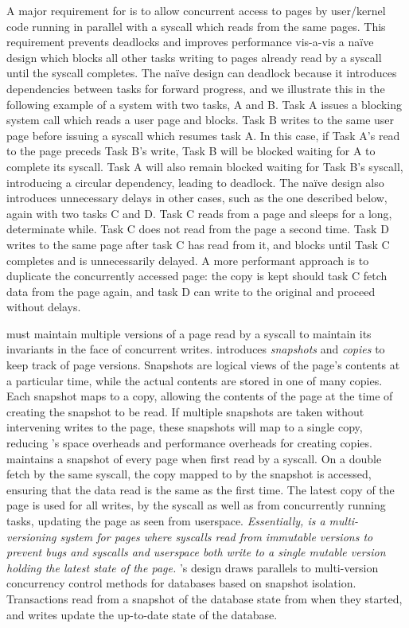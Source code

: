 \documentclass[letterpaper,twocolumn,10pt, anonymous]{article}
\begin{document}
A major requirement for \tiktok is to allow concurrent access to pages
by user/kernel code running in parallel with a syscall which reads from 
the same pages.
This requirement prevents deadlocks and improves performance vis-a-vis
a na\"ive design which blocks all other tasks writing to pages already 
read by a syscall until the syscall completes.
The na\"ive design can deadlock because it introduces dependencies between
tasks for forward progress, and we illustrate this in the following example
of a system with two tasks, A and B.
Task A issues a blocking system call which reads a user page and blocks. 
Task B writes to the same user page before issuing a syscall which 
resumes task A. 
In this case, if Task A's read to the page preceds Task B's write, 
Task B will be blocked waiting for A to complete its syscall.
Task A will also remain blocked waiting for Task B's syscall, 
introducing a circular dependency, leading to deadlock.
The na\"ive design also introduces unnecessary delays in other cases, 
such as the one described below, again with two tasks C and D.
Task C reads from a page and sleeps for a long, determinate while.
Task C does not read from the page a second time.
Task D writes to the same page after task C has read from it, and 
blocks until Task C completes and is unnecessarily delayed.
A more performant approach is to duplicate the concurrently accessed page: the copy is 
kept should task C fetch data from the page again, and task D
can write to the original and proceed without delays.

\tiktok must maintain multiple versions of a page read by a syscall 
to maintain its invariants in the face of concurrent writes.
\tiktok introduces \emph{snapshots} and \emph{copies} to keep track 
of page versions. 
Snapshots are logical views of the page's contents at a particular time,
while the actual contents are stored in one of many copies. 
Each snapshot maps to a copy, allowing the contents of the page at the 
time of creating the snapshot to be read. 
If multiple snapshots are taken without intervening writes to the page, 
these snapshots will map to a single copy, reducing \tiktok's space overheads 
and performance overheads for creating copies.
\tiktok maintains a snapshot of every page when first read by a syscall.
On a double fetch by the same syscall, the copy mapped to by the snapshot 
is accessed, ensuring that the data read is the same as the first time.
The latest copy of the page is used for all writes, by the syscall as 
well as from concurrently running tasks, updating the page as seen 
from userspace.
\emph{Essentially, \tiktok is a multi-versioning system for pages where 
syscalls read from immutable versions to prevent \tocttou bugs and
syscalls and userspace both write to a single mutable version 
holding the latest state of the page.}
\tiktok's design draws parallels to multi-version concurrency control 
methods for databases based on snapshot isolation. 
Transactions read from a snapshot of the database state from when 
they started, and writes update the up-to-date state of the database.
\end{document}
